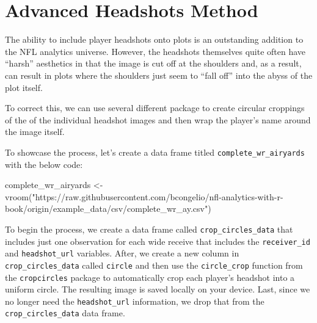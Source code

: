 \documentclass[
  letterpaper,
]{krantz}
\newenvironment{Shaded}{\begin{snugshade}}{\end{snugshade}}
\newcommand{\FunctionTok}[1]{\textcolor[rgb]{0.28,0.35,0.67}{#1}}
\newcommand{\NormalTok}[1]{\textcolor[rgb]{0.00,0.23,0.31}{#1}}
\newcommand{\OtherTok}[1]{\textcolor[rgb]{0.00,0.23,0.31}{#1}}
\newcommand{\StringTok}[1]{\textcolor[rgb]{0.13,0.47,0.30}{#1}}
\begin{document}
\hypertarget{advanced-headshots-method}{%
\section{Advanced Headshots Method}\label{advanced-headshots-method}}

The ability to include player headshots onto plots is an outstanding
addition to the NFL analytics universe. However, the headshots
themselves quite often have ``harsh'' aesthetics in that the image is
cut off at the shoulders and, as a result, can result in plots where the
shoulders just seem to ``fall off'' into the abyss of the plot itself.

To correct this, we can use several different package to create circular
croppings of the of the individual headshot images and then wrap the
player's name around the image itself.

To showcase the process, let's create a data frame titled
\texttt{complete\_wr\_airyards} with the below code:

\begin{Shaded}
\begin{Highlighting}[]
\NormalTok{complete\_wr\_airyards }\OtherTok{\textless{}{-}}
  \FunctionTok{vroom}\NormalTok{(}\StringTok{"https://raw.githubusercontent.com/bcongelio/nfl{-}analytics{-}with{-}r{-}book/origin/example\_data/csv/complete\_wr\_ay.csv"}\NormalTok{)}
\end{Highlighting}
\end{Shaded}

To begin the process, we create a data frame called
\texttt{crop\_circles\_data} that includes just one observation for each
wide receive that includes the \texttt{receiver\_id} and
\texttt{headshot\_url} variables. After, we create a new column in
\texttt{crop\_circles\_data} called \texttt{circle} and then use the
\texttt{circle\_crop} function from the \texttt{cropcircles} package to
automatically crop each player's headshot into a uniform circle. The
resulting image is saved locally on your device. Last, since we no
longer need the \texttt{headshot\_url} information, we drop that from
the \texttt{crop\_circles\_data} data frame.
\end{document}
